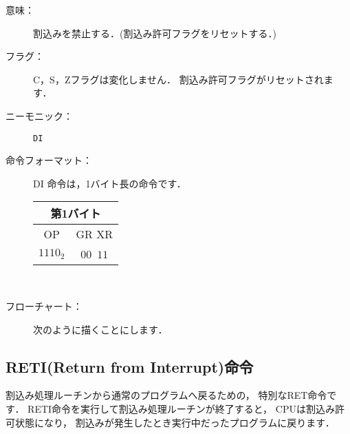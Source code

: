 \begin{description}
\item[意味：]割込みを禁止する．(割込み許可フラグをリセットする．)

\item[フラグ：]C，S，Zフラグは変化しません．
割込み許可フラグがリセットされます．

\item[ニーモニック：] {\tt DI}

\item[命令フォーマット：]DI 命令は，1バイト長の命令です．

\begin{tabular}{|c|c|} \hline
\multicolumn{2}{|c|}{第1バイト} \\
\hline
OP & GR XR \\
\hline
$1110_2$ & $00$~$11$ \\
\hline
\end{tabular}\\

\item[フローチャート：]
次のように描くことにします．

\begin{flushleft}
\epsfxsize=3cm
\end{flushleft}

\end{description}

\subsection{RETI(Return from Interrupt)命令}

割込み処理ルーチンから通常のプログラムへ戻るための，
特別なRET命令です．
RETI命令を実行して割込み処理ルーチンが終了すると，
CPUは割込み許可状態になり，
割込みが発生したとき実行中だったプログラムに戻ります．

